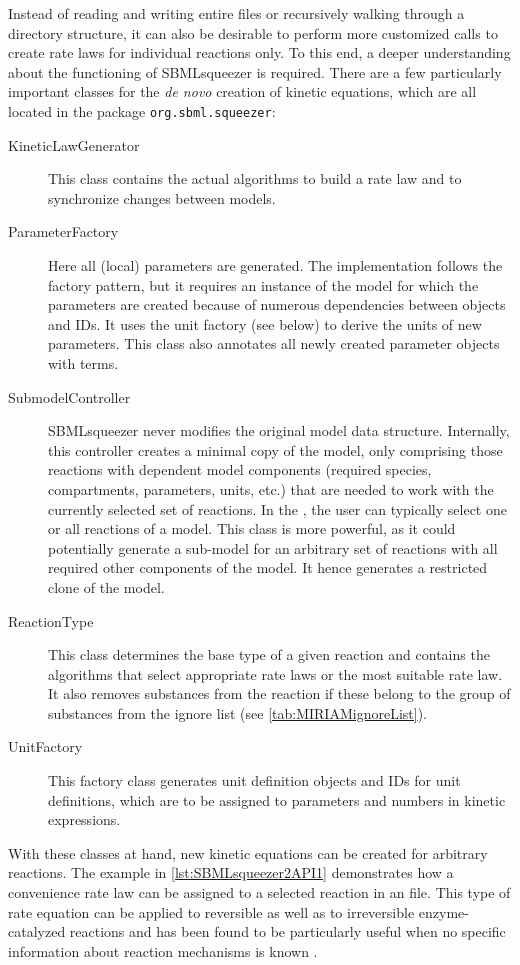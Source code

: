Instead of reading and writing entire files or recursively walking through a directory structure, it can also be desirable to perform more customized calls to create rate laws for individual reactions only.
To this end, a deeper understanding about the functioning of SBMLsqueezer is required.
There are a few particularly important classes for the \emph{de novo} creation of kinetic equations, which are all located in the package \texttt{org.sbml.squeezer}:
\begin{description}
  \item[KineticLawGenerator] This class contains the actual algorithms to build a rate law and to synchronize changes between models.
  \item[ParameterFactory]
    Here all (local) parameters are generated.
    The implementation follows the factory pattern, but it requires an instance of the model for which the parameters are created because of numerous dependencies between objects and \acp{ID}.
    It uses the unit factory (see below) to derive the units of new parameters.
    This class also annotates all newly created parameter objects with \SBO terms.
  \item[SubmodelController]
    SBMLsqueezer never modifies the original model data structure.
    Internally, this controller creates a minimal copy of the model, only comprising those reactions with dependent model components (required species, compartments, parameters, units, etc.) that are needed to work with the currently selected set of reactions.
    In the \GUI, the user can typically select one or all reactions of a model.
    This class is more powerful, as it could potentially generate a sub-model for an arbitrary set of reactions with all required other components of the model.
    It hence generates a restricted clone of the model.
  \item[ReactionType]
    This class determines the base type of a given reaction and contains the algorithms that select appropriate rate laws or the most suitable rate law.
    It also removes substances from the reaction if these belong to the group of substances from the ignore list (see  \vref{tab:MIRIAMignoreList}).
  \item[UnitFactory]
    This factory class generates unit definition objects and \acp{ID} for unit definitions, which are to be assigned to parameters and numbers in kinetic expressions.
\end{description}
\renewcommand{\descriptionlabel}[1]{\textcolor{black}{\textbf{#1}}}
With these classes at hand, new kinetic equations can be created for arbitrary reactions.
The example in \vref{lst:SBMLsqueezer2API1} demonstrates how a convenience rate law \citep{Liebermeister2006} can be assigned to a selected reaction in an \SBML file.
This type of rate equation can be applied to reversible as well as to irreversible enzyme-catalyzed reactions and has been found to be particularly useful when no specific information about reaction mechanisms is known \citep{Draeger2007b, Draeger2009a, Draeger2011a}.


